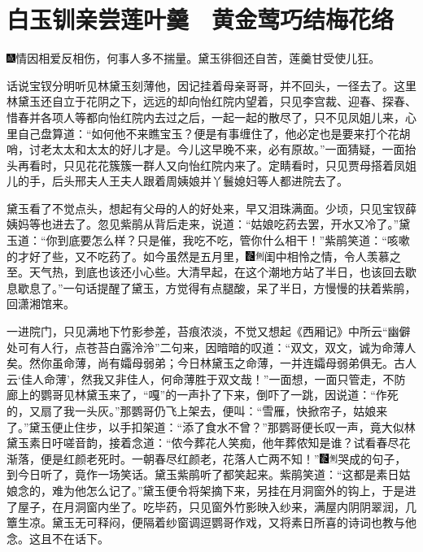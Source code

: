

\chapter{白玉钏亲尝莲叶羹　黄金莺巧结梅花络}\label{part0039_split_000.htmlux5cux23calibre_pb_0}

{\includegraphics[width=3mm]{../Images/00005}情因相爱反相伤，何事人多不揣量。黛玉徘徊还自苦，莲羹甘受使儿狂。}

话说宝钗分明听见林黛玉刻薄他，因记挂着母亲哥哥，并不回头，一径去了。这里林黛玉还自立于花阴之下，远远的却向怡红院内望着，只见李宫裁、迎春、探春、惜春并各项人等都向怡红院内去过之后，一起一起的散尽了，只不见凤姐儿来，心里自己盘算道：``如何他不来瞧宝玉？便是有事缠住了，他必定也是要来打个花胡哨，讨老太太和太太的好儿才是。今儿这早晚不来，必有原故。''一面猜疑，一面抬头再看时，只见花花簇簇一群人又向怡红院内来了。定睛看时，只见贾母搭着凤姐儿的手，后头邢夫人王夫人跟着周姨娘并丫鬟媳妇等人都进院去了。

黛玉看了不觉点头，想起有父母的人的好处来，早又泪珠满面。少顷，只见宝钗薛姨妈等也进去了。忽见紫鹃从背后走来，说道：``姑娘吃药去罢，开水又冷了。''黛玉道：``你到底要怎么样？只是催，我吃不吃，管你什么相干！''紫鹃笑道：``咳嗽的才好了些，又不吃药了。如今虽然是五月里，{\includegraphics[width=3mm]{../Images/00006}\includegraphics[width=3mm]{../Images/00011}\footnotesize \kaishu 闺中相怜之情，令人羡慕之至。}天气热，到底也该还小心些。大清早起，在这个潮地方站了半日，也该回去歇息歇息了。''一句话提醒了黛玉，方觉得有点腿酸，呆了半日，方慢慢的扶着紫鹃，回潇湘馆来。

一进院门，只见满地下竹影参差，苔痕浓淡，不觉又想起《西厢记》中所云``幽僻处可有人行，点苍苔白露泠泠''二句来，因暗暗的叹道：``双文，双文，诚为命薄人矣。然你虽命薄，尚有孀母弱弟；今日林黛玉之命薄，一并连孀母弱弟俱无。古人云`佳人命薄'，然我又非佳人，何命薄胜于双文哉！''一面想，一面只管走，不防廊上的鹦哥见林黛玉来了，``嘎''的一声扑了下来，倒吓了一跳，因说道：``作死的，又扇了我一头灰。''那鹦哥仍飞上架去，便叫：``雪雁，快掀帘子，姑娘来了。''黛玉便止住步，以手扣架道：``添了食水不曾？''那鹦哥便长叹一声，竟大似林黛玉素日吁嗟音韵，接着念道：``侬今葬花人笑痴，他年葬侬知是谁？试看春尽花渐落，便是红颜老死时。一朝春尽红颜老，花落人亡两不知！''{\includegraphics[width=3mm]{../Images/00006}\includegraphics[width=3mm]{../Images/00011}\footnotesize \kaishu 哭成的句子，到今日听了，竟作一场笑话。}黛玉紫鹃听了都笑起来。紫鹃笑道：``这都是素日姑娘念的，难为他怎么记了。''黛玉便令将架摘下来，另挂在月洞窗外的钩上，于是进了屋子，在月洞窗内坐了。吃毕药，只见窗外竹影映入纱来，满屋内阴阴翠润，几簟生凉。黛玉无可释闷，便隔着纱窗调逗鹦哥作戏，又将素日所喜的诗词也教与他念。这且不在话下。

